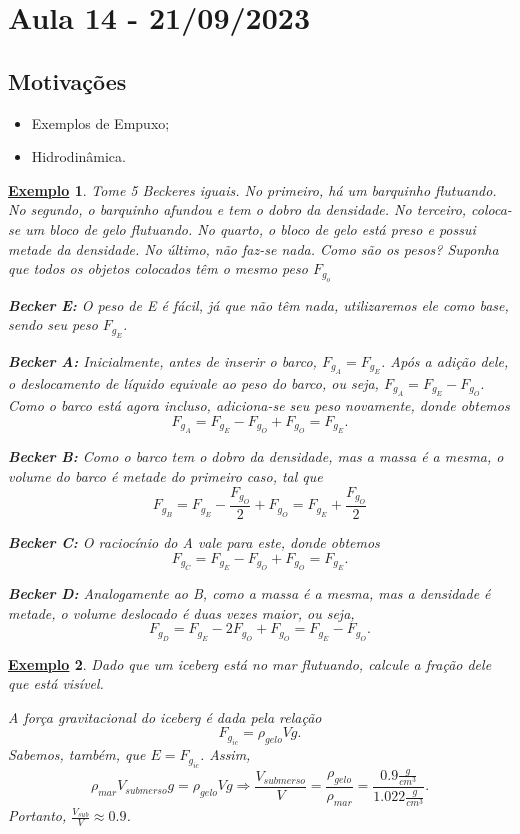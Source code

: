 \documentclass{article}
\newtheorem{example}{\underline{Exemplo}}
\begin{document}
\section{Aula 14 - 21/09/2023}
\subsection{Motivações}
\begin{itemize}
  \item Exemplos de Empuxo;
  \item Hidrodinâmica.
\end{itemize}
\begin{example}
  Tome 5 Beckeres iguais. No primeiro, há um barquinho flutuando. No segundo, o barquinho afundou e tem o dobro da densidade. No terceiro,
coloca-se um bloco de gelo flutuando. No quarto, o bloco de gelo está preso e possui metade da densidade. No último, não faz-se nada. Como são os pesos?
Suponha que todos os objetos colocados têm o mesmo peso \(F_{g_{o}}\)

\textbf{Becker E:}
  O peso de E é fácil, já que não têm nada, utilizaremos ele como base, sendo seu peso \(F_{g_{E}}\).  

\textbf{Becker A:}
  Inicialmente, antes de inserir o barco, \(F_{g_{A}} = F_{g_{E}}\). Após a adição dele, o deslocamento de líquido equivale ao peso do barco,
ou seja, \(F_{g_{A}} = F_{g_{E}}-F_{g_{O}}.\) Como o barco está agora incluso, adiciona-se seu peso novamente, donde obtemos 
  \[
    F_{g_{A}} = F_{g_{E}} - F_{g_{O}} + F_{g_{O}} = F_{g_{E}}.
  \]

\textbf{Becker B:}
  Como o barco tem o dobro da densidade, mas a massa é a mesma, o volume do barco é metade do primeiro caso, tal que 
    \[
      F_{g_{B}} = F_{g_{E}} - \frac{F_{g_{O}}}{2} + F_{g_{O}} = F_{g_{E}} + \frac{F_{g_{O}}}{2}
    \]

  \textbf{Becker C:}
    O raciocínio do A vale para este, donde obtemos 
      \[
        F_{g_{C}} = F_{g_{E}} - F_{g_{O}} + F_{g_{O}} = F_{g_{E}}.
      \]

  \textbf{Becker D:}
    Analogamente ao B, como a massa é a mesma, mas a densidade é metade, o volume deslocado é duas vezes maior, ou seja, 
      \[
        F_{g_{D}} = F_{g_{E}} - 2 F_{g_{O}} + F_{g_{O}} = F_{g_{E}} - F_{g_{O}}.
      \]
\end{example}
\begin{example}
  Dado que um iceberg está no mar flutuando, calcule a fração dele que está visível.

  A força gravitacional do iceberg é dada pela relação 
    \[
      F_{g_{ic}} = \rho_{gelo}Vg.
    \]
  Sabemos, também, que \(E = F_{g_{ic}}\). Assim, 
    \[
      \rho_{mar}V_{submerso}g = \rho_{gelo}Vg \Rightarrow \frac{V_{submerso}}{V} = \frac{\rho_{gelo}}{\rho_{mar}} = \frac{0.9\frac{g}{cm^{3}}}{1.022\frac{g}{cm^{3}}}.
    \]
  Portanto, \(\frac{V_{sub}}{V}\approx 0.9\).
\end{example}
\end{document}
